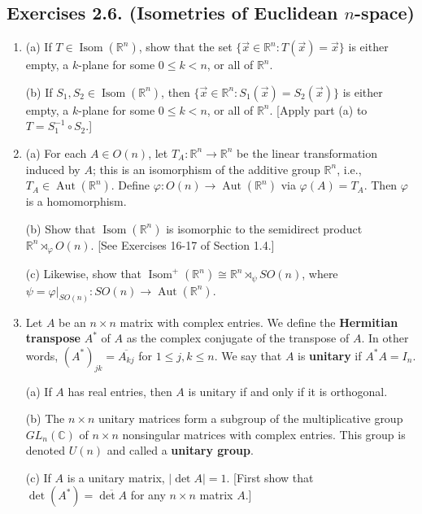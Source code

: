 \documentclass[leqno]{book}
\begin{document}
\subsection*{Exercises 2.6. (Isometries of Euclidean $n$-space)}
\begin{enumerate}
\item (a) If $T\in\operatorname{Isom}(\mathbb R^n)$, show that the set $\{\vec x\in\mathbb R^n:T(\vec x)=\vec x\}$ is either empty, a $k$-plane for some $0\leqslant k<n$, or all of $\mathbb R^n$.

(b) If $S_1,S_2\in\operatorname{Isom}(\mathbb R^n)$, then $\{\vec x\in\mathbb R^n:S_1(\vec x)=S_2(\vec x)\}$ is either empty, a $k$-plane for some $0\leqslant k<n$, or all of $\mathbb R^n$.  [Apply part (a) to $T=S_1^{-1}\circ S_2$.]

\item (a) For each $A\in O(n)$, let $T_A:\mathbb R^n\to\mathbb R^n$ be the linear transformation induced by $A$; this is an isomorphism of the additive group $\mathbb R^n$, i.e., $T_A\in\operatorname{Aut}(\mathbb R^n)$.  Define $\varphi:O(n)\to\operatorname{Aut}(\mathbb R^n)$ via $\varphi(A)=T_A$.  Then $\varphi$ is a homomorphism.

(b) Show that $\operatorname{Isom}(\mathbb R^n)$ is isomorphic to the semidirect product $\mathbb R^n\rtimes_\varphi O(n)$.  [See Exercises 16-17 of Section 1.4.]

(c) Likewise, show that $\operatorname{Isom}^+(\mathbb R^n)\cong\mathbb R^n\rtimes_\psi SO(n)$, where $\psi=\varphi|_{SO(n)}:SO(n)\to\operatorname{Aut}(\mathbb R^n)$.

\item Let $A$ be an $n\times n$ matrix with complex entries.  We define the \textbf{Hermitian transpose} $A^*$ of $A$ as the complex conjugate of the transpose of $A$.  In other words, $(A^*)_{jk}=\overline{A_{kj}}$ for $1\leqslant j,k\leqslant n$.  We say that $A$ is \textbf{unitary} if $A^*A=I_n$.

(a) If $A$ has real entries, then $A$ is unitary if and only if it is orthogonal.

(b) The $n\times n$ unitary matrices form a subgroup of the multiplicative group $GL_n(\mathbb C)$ of $n\times n$ nonsingular matrices with complex entries.  This group is denoted $U(n)$ and called a \textbf{unitary group}.

(c) If $A$ is a unitary matrix, $|\det A|=1$.  [First show that $\det(A^*)=\overline{\det A}$ for any $n\times n$ matrix $A$.]


\end{enumerate}
\end{document}
